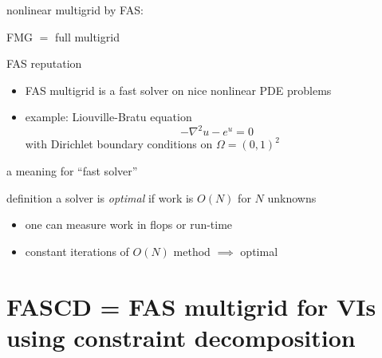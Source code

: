 \documentclass[svgnames,
               hyperref={colorlinks,citecolor=DeepPink4,linkcolor=FireBrick,urlcolor=Maroon},
               usepdftitle=false]  %
               {beamer}
\begin{document}
\begin{frame}{nonlinear multigrid by FAS: }
{\centering


FMG $=$ full multigrid

\vspace{6mm}
}
\end{frame}


\begin{frame}{FAS reputation}

\begin{itemize}
\item FAS multigrid is a fast solver on nice nonlinear PDE problems
\item example: Liouville-Bratu equation
    $$-\nabla^2 u - e^u = 0$$
with Dirichlet boundary conditions on $\Omega=(0,1)^2$
\end{itemize}
\end{frame}


\begin{frame}{a meaning for ``fast solver''}

\begin{block}{definition} a solver is \emph{optimal} if work is $O(N)$ for $N$ unknowns
\end{block}

\bigskip
\begin{itemize}
\item one can measure work in flops or run-time
\item constant iterations of $O(N)$ method $\implies$ optimal
\end{itemize}
\end{frame}


\section{FASCD = FAS multigrid for VIs using constraint decomposition}
\end{document}
